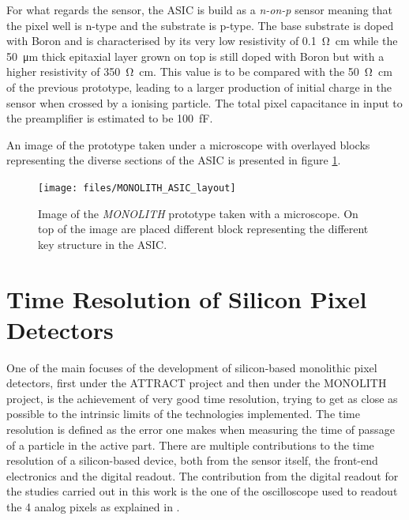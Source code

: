 		For what regards the sensor, the ASIC is build as a \textit{n-on-p} sensor meaning that the pixel well is n-type and the substrate is p-type. The base substrate is doped with Boron and is characterised by its very low resistivity of \SI{0.1}{\ohm \centi\meter} while the \SI{50}{\micro\meter} thick epitaxial layer grown on top is still doped with Boron but with a higher resistivity of \SI{350}{\ohm \centi\meter}. This value is to be compared with the \SI{50}{\ohm \centi\meter} of the previous prototype, leading to a larger production of initial charge in the sensor when crossed by a ionising particle. The total pixel capacitance in input to the preamplifier is estimated to be \SI{100}{\femto\farad}. 
		
		An image of the prototype taken under a microscope with overlayed blocks representing the diverse sections of the ASIC is presented in figure \ref{im:MONOLITH_ASIC_layout}.
		\begin{figure}[h]
			\centering
			\texttt{[image: files/MONOLITH\_ASIC\_layout]}
			\caption{Image of the \textit{MONOLITH} prototype taken with a microscope. On top of the image are placed different block representing the different key structure in the ASIC. }
			\label{im:MONOLITH_ASIC_layout}
		\end{figure} 
		 
		
		
	\clearpage
	\section{Time Resolution of Silicon Pixel Detectors}
	One of the main focuses of the development of silicon-based monolithic pixel detectors, first under the ATTRACT project and then under the MONOLITH project, is the achievement of very good time resolution, trying to get as close as possible to the intrinsic limits of the technologies implemented. The time resolution is defined as the error one makes when measuring the time of passage of a particle in the active part. There are multiple contributions to the time resolution of a silicon-based device, both from the sensor itself, the front-end electronics and the digital readout. The contribution from the digital readout for the studies carried out in this work is the one of the oscilloscope used to readout the 4 analog pixels as explained in . 
	
